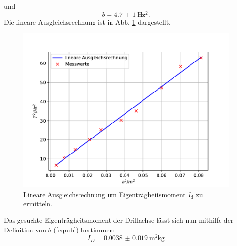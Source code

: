 und
\begin{equation*}
    b = \SI{4.7(10)}{\hertz^2} .
\end{equation*}
Die lineare Ausgleichsrechnung ist in Abb. \ref{fig:ausgleich} dargestellt.
\begin{figure}
    \centering
    \includegraphics[width=\textwidth]{content/data/ausgleich.pdf}
    \caption{Lineare Ausgleichsrechnung um Eigenträgheitsmoment $I_\text{d}$ zu ermitteln. \cite{matplotlib}}
    \label{fig:ausgleich}
\end{figure}
Das gesuchte Eigenträgheitsmoment der Drillachse lässt sich nun mithilfe der Definition von $b$ (\autoref{eqn:b}) bestimmen:
\begin{equation*}
    I_D = \SI{0.0038(190)}{\metre^2\kg}
\end{equation*}

\FloatBarrier

